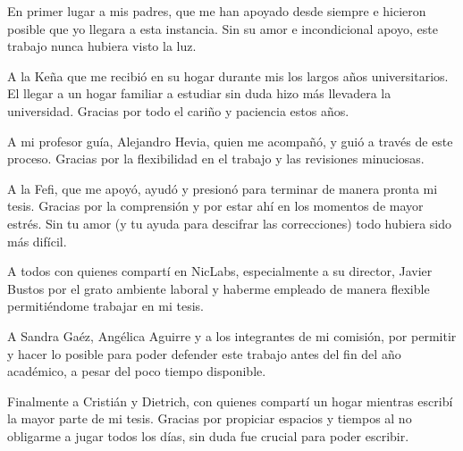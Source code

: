 En primer lugar a mis padres, que me han apoyado desde siempre e hicieron
  posible que yo llegara a esta instancia.
Sin su amor e incondicional apoyo, este trabajo nunca hubiera visto la luz.

A la Ke\~na que me recibi\'o en su hogar durante mis los largos a\~nos
  universitarios. El llegar a un hogar familiar a estudiar sin duda hizo
  m\'as llevadera la universidad. Gracias por todo el cari\~no y paciencia
  estos a\~nos.

A mi profesor gu\'ia, Alejandro Hevia, quien me acompa\~n\'o, y gui\'o
  a trav\'es de este proceso. Gracias por la flexibilidad en el trabajo
  y las revisiones minuciosas.

A la Fefi, que me apoy\'o, ayud\'o y presion\'o para terminar de
  manera pronta mi tesis. Gracias por la comprensi\'on y por estar ah\'i en los
  momentos de mayor estr\'es. Sin tu amor (y tu ayuda para descifrar las
  correcciones) todo hubiera sido m\'as dif\'icil.

A todos con quienes compart\'i en NicLabs, especialmente a su director, Javier
  Bustos por el grato ambiente laboral y haberme empleado de manera flexible
  permiti\'endome trabajar en mi tesis.

A Sandra Ga\'ez, Ang\'elica Aguirre y a los integrantes de mi comisi\'on, por
  permitir y hacer lo posible para poder defender este trabajo antes del fin
  del a\~no acad\'emico, a pesar del poco tiempo disponible.

Finalmente a Cristi\'an y Dietrich, con quienes compart\'i un hogar mientras
  escrib\'i la mayor parte de mi tesis. Gracias por propiciar espacios
  y tiempos al no obligarme a jugar todos los d\'ias, sin duda fue crucial
  para poder escribir.
